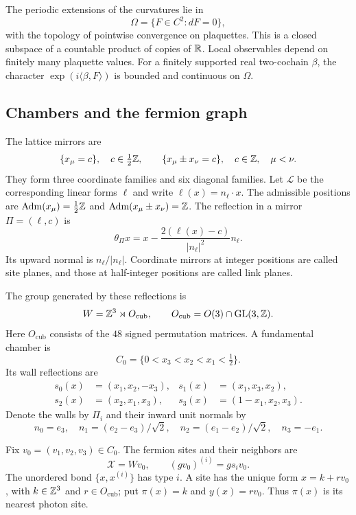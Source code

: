 The periodic extensions of the curvatures lie in
\[
 \Omega=\{F\in C^2:dF=0\},
\]
with the topology of pointwise convergence on plaquettes. This is a
closed subspace of a countable product of copies of $\mathbb R$. Local
observables depend on finitely many plaquette values. For a finitely
supported real two-cochain $\beta$, the character
$\exp(i\langle\beta,F\rangle)$ is bounded and continuous on $\Omega$.

\subsection{Chambers and the fermion graph}\label{subsec:reg-chambers}

The lattice mirrors are
\begin{equation}\label{eq:reg-mirrors}
 \{x_\mu=c\},\quad c\in\tfrac12\mathbb Z,
 \qquad
 \{x_\mu\pm x_\nu=c\},\quad c\in\mathbb Z,\quad\mu<\nu.
\end{equation}
They form three coordinate families and six diagonal families. Let
$\mathcal L$ be the corresponding linear forms $\ell$ and write
$\ell(x)=n_\ell\cdot x$. The admissible positions are
$\operatorname{Adm}(x_\mu)=\frac12\mathbb Z$ and
$\operatorname{Adm}(x_\mu\pm x_\nu)=\mathbb Z$. The reflection in a mirror
$\Pi=(\ell,c)$ is
\begin{equation}\label{eq:reg-reflection}
 \theta_\Pi x=x-\frac{2(\ell(x)-c)}{|n_\ell|^2}n_\ell.
\end{equation}
Its upward normal is $n_\ell/|n_\ell|$. Coordinate mirrors at integer
positions are called site planes, and those at half-integer positions
are called link planes.

The group generated by these reflections is
\[
 W=\mathbb Z^3\rtimes O_{\mathrm{cub}},
 \qquad O_{\mathrm{cub}}=O(3)\cap\operatorname{GL}(3,\mathbb Z).
\]
Here $O_{\mathrm{cub}}$ consists of the $48$ signed permutation matrices.
A fundamental chamber is
\[
 C_0=\{0<x_3<x_2<x_1<\tfrac12\}.
\]
Its wall reflections are
\begin{align*}
 s_0(x)&=(x_1,x_2,-x_3),&
 s_1(x)&=(x_1,x_3,x_2),\\
 s_2(x)&=(x_2,x_1,x_3),&
 s_3(x)&=(1-x_1,x_2,x_3).
\end{align*}
Denote the walls by $\Pi_i$ and their inward unit normals by
\begin{equation}\label{eq:reg-wall-normals}
 n_0=e_3,\quad n_1=(e_2-e_3)/\sqrt2,
 \quad n_2=(e_1-e_2)/\sqrt2,\quad n_3=-e_1.
\end{equation}

Fix $v_0=(v_1,v_2,v_3)\in C_0$. The fermion sites and their neighbors
are
\begin{equation}\label{eq:reg-fermion-sites}
 \mathcal X=Wv_0,\qquad (gv_0)^{(i)}=gs_iv_0.
\end{equation}
The unordered bond $\{x,x^{(i)}\}$ has type $i$. A site has the unique
form $x=k+rv_0$, with $k\in\mathbb Z^3$ and $r\in O_{\mathrm{cub}}$; put
$\pi(x)=k$ and $y(x)=rv_0$. Thus $\pi(x)$ is its nearest photon site.

